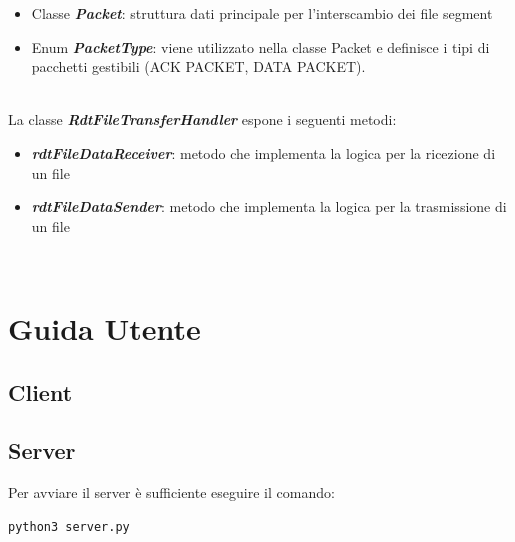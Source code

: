 \documentclass{article}
\begin{document}
	\begin{itemize}
			\item Classe \textbf{\emph{Packet}}: struttura dati principale per l'interscambio dei file segment
			\item Enum \textbf{\emph{PacketType}}: viene utilizzato nella classe Packet e definisce i tipi di pacchetti gestibili (ACK PACKET, DATA PACKET).
		\end{itemize}
	\ \\

La classe \textbf{\emph{RdtFileTransferHandler}} espone i seguenti metodi:

	\begin{itemize}
		\item \textbf{\emph{rdtFileDataReceiver}}: metodo che implementa la logica per la ricezione di un file
		\item \textbf{\emph{rdtFileDataSender}}: metodo che implementa la logica per la trasmissione di un file
	\end{itemize}
\ \\


\newpage
\section{Guida Utente}
\subsection{Client}
\subsection{Server}


Per avviare il server è sufficiente eseguire il comando:

\begin{verbatim}
python3 server.py
\end{verbatim}
\end{document}
